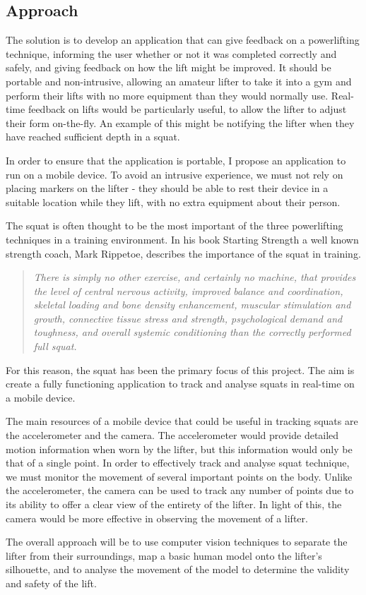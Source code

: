 \subsection{Approach}

The solution is to develop an application that can give feedback on a powerlifting technique, informing the user whether or not it was completed correctly and safely, and giving feedback on how the lift might be improved. It should be portable and non-intrusive, allowing an amateur lifter to take it into a gym and perform their lifts with no more equipment than they would normally use. Real-time feedback on lifts would be particularly useful, to allow the lifter to adjust their form on-the-fly. An example of this might be notifying the lifter when they have reached sufficient depth in a squat.

In order to ensure that the application is portable, I propose an application to run on a mobile device. To avoid an intrusive experience, we must not rely on placing markers on the lifter - they should be able to rest their device in a suitable location while they lift, with no extra equipment about their person.

The squat is often thought to be the most important of the three powerlifting techniques in a training environment. In his book Starting Strength\cite{startingstrength} a well known strength coach, Mark Rippetoe, describes the importance of the squat in training.

\begin{quote}
\emph{There is simply no other exercise, and certainly no machine, that provides the level of central nervous activity, improved balance and coordination, skeletal loading and bone density enhancement, muscular stimulation and growth, connective tissue stress and strength, psychological demand and toughness, and overall systemic conditioning than the correctly performed full squat.}
\end{quote}

For this reason, the squat has been the primary focus of this project. The aim is create a fully functioning application to track and analyse squats in real-time on a mobile device.

The main resources of a mobile device that could be useful in tracking squats are the accelerometer and the camera. The accelerometer would provide detailed motion information when worn by the lifter, but this information would only be that of a single point. In order to effectively track and analyse squat technique, we must monitor the movement of several important points on the body. Unlike the accelerometer, the camera can be used to track any number of points due to its ability to offer a clear view of the entirety of the lifter. In light of this, the camera would be more effective in observing the movement of a lifter.

The overall approach will be to use computer vision techniques to separate the lifter from their surroundings, map a basic human model onto the lifter's silhouette, and to analyse the movement of the model to determine the validity and safety of the lift.
